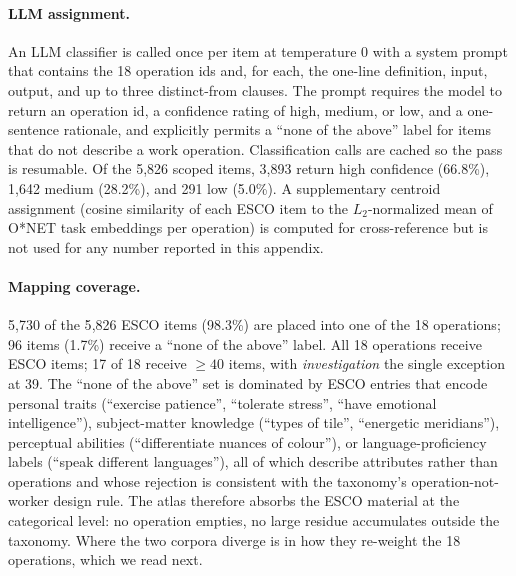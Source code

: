 \documentclass{article}
\begin{document}
\paragraph{LLM assignment.} An LLM classifier is called once per item at temperature 0 with a system prompt that contains the 18 operation ids and, for each, the one-line definition, input, output, and up to three distinct-from clauses.
The prompt requires the model to return an operation id, a confidence rating of high, medium, or low, and a one-sentence rationale, and explicitly permits a ``none of the above'' label for items that do not describe a work operation.
Classification calls are cached so the pass is resumable.
Of the 5{,}826 scoped items, 3{,}893 return high confidence (66.8\%), 1{,}642 medium (28.2\%), and 291 low (5.0\%).
A supplementary centroid assignment (cosine similarity of each ESCO item to the $L_{2}$-normalized mean of O{*}NET task embeddings per operation) is computed for cross-reference but is not used for any number reported in this appendix.

\paragraph{Mapping coverage.} 5{,}730 of the 5{,}826 ESCO items (98.3\%) are placed into one of the 18 operations; 96 items (1.7\%) receive a ``none of the above'' label.
All 18 operations receive ESCO items; 17 of 18 receive $\geq\!40$ items, with \emph{investigation} the single exception at 39.
The ``none of the above'' set is dominated by ESCO entries that encode personal traits (``exercise patience'', ``tolerate stress'', ``have emotional intelligence''), subject-matter knowledge (``types of tile'', ``energetic meridians''), perceptual abilities (``differentiate nuances of colour''), or language-proficiency labels (``speak different languages''), all of which describe attributes rather than operations and whose rejection is consistent with the taxonomy's operation-not-worker design rule.
The atlas therefore absorbs the ESCO material at the categorical level: no operation empties, no large residue accumulates outside the taxonomy.
Where the two corpora diverge is in how they re-weight the 18 operations, which we read next.
\end{document}
